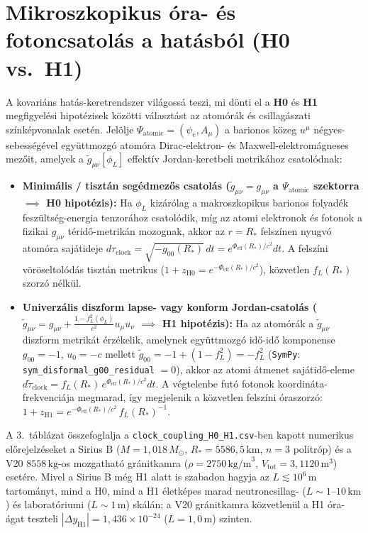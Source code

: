 \documentclass[10pt,a4paper]{article}
\begin{document}
\section{Mikroszkopikus óra- és fotoncsatolás a hatásból (H0 vs.\ H1)}
A kovariáns hatás-keretrendszer világossá teszi, mi dönti el a \textbf{H0} és \textbf{H1} megfigyelési hipotézisek közötti választást az atomórák és csillagászati színképvonalak esetén. Jelölje $\Psi_{\text{atomic}} = (\psi_e, A_\mu)$ a barionos közeg $u^\mu$ négyes-sebességével együttmozgó atomóra Dirac-elektron- és Maxwell-elektromágneses mezőit, amelyek a $\tilde{g}_{\mu\nu}[\phi_L]$ effektív Jordan-keretbeli metrikához csatolódnak:
\begin{itemize}\setlength{\itemsep}{1pt}\setlength{\parskip}{0pt}
  \item \textbf{Minimális / tisztán segédmezős csatolás ($\tilde{g}_{\mu\nu} = g_{\mu\nu}$ a $\Psi_{\text{atomic}}$ szektorra $\implies$ H0 hipotézis):} Ha $\phi_L$ kizárólag a makroszkopikus barionos folyadék feszültség-energia tenzorához csatolódik, míg az atomi elektronok és fotonok a fizikai $g_{\mu\nu}$ téridő-metrikán mozognak, akkor az $r = R_*$ felszínen nyugvó atomóra sajátideje $d\tau_{\text{clock}} = \sqrt{-g_{00}(R_*)}\,dt = e^{\Phi_{\text{eff}}(R_*)/c^2}dt$. A felszíni vöröseltolódás tisztán metrikus ($1+z_{\text{H0}} = e^{-\Phi_{\text{eff}}(R_*)/c^2}$), közvetlen $f_L(R_*)$ szorzó nélkül.
  \item \textbf{Univerzális diszform lapse- vagy konform Jordan-csatolás ($\tilde{g}_{\mu\nu} = g_{\mu\nu} + \frac{1 - f_L^2(\phi_L)}{c^2}u_\mu u_\nu$ $\implies$ H1 hipotézis):} Ha az atomórák a $\tilde{g}_{\mu\nu}$ diszform metrikát érzékelik, amelynek együttmozgó idő-idő komponense $g_{00}=-1$, $u_0=-c$ mellett $\tilde{g}_{00} = -1 + (1-f_L^2) = -f_L^2$ (\texttt{SymPy}: \texttt{sym\_disformal\_g00\_residual} $=0$), akkor az atomi átmenet sajátidő-eleme $d\tilde{\tau}_{\text{clock}} = f_L(R_*)\,e^{\Phi_{\text{eff}}(R_*)/c^2}dt$. A végtelenbe futó fotonok koordináta-frekvenciája megmarad, így megjelenik a közvetlen felszíni óraszorzó: $1+z_{\text{H1}} = e^{-\Phi_{\text{eff}}(R_*)/c^2}\,f_L(R_*)^{-1}$.
\end{itemize}
A 3.\ táblázat összefoglalja a \texttt{clock\_coupling\_H0\_H1.csv}-ben kapott numerikus előrejelzéseket a Sirius B ($M=1{,}018\,M_\odot$, $R_*=5586{,}5\,\text{km}$, $n=3$ politróp) és a V20 $8558\,\text{kg}$-os mozgatható gránitkamra ($\rho=2750\,\text{kg/m}^3$, $V_{\text{tot}}=3{,}1120\,\text{m}^3$) esetére. Mivel a Sirius B még H1 alatt is szabadon hagyja az $L \lesssim 10^6\,\text{m}$ tartományt, mind a H0, mind a H1 életképes marad neutroncsillag- ($L \sim 1\text{--}10\,\text{km}$) és laboratóriumi ($L \sim 1\,\text{m}$) skálán; a V20 gránitkamra közvetlenül a H1 óra-ágat teszteli $|\Delta y_{\text{H1}}| = 1{,}436\times 10^{-24}$ ($L=1{,}0\,\text{m}$) szinten.
\end{document}
